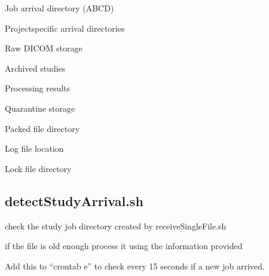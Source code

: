 \documentclass[letterpaper,10pt,english]{sphinxmanual}
\begin{document}
\begin{DUlineblock}{0em}
\item[] \sphinxhyphen{}  \sphinxhyphen{} Job arrival directory (ABCD)
\item[] \sphinxhyphen{}  \sphinxhyphen{} Project\sphinxhyphen{}specific arrival directories
\item[] \sphinxhyphen{}  \sphinxhyphen{} Raw DICOM storage
\item[] \sphinxhyphen{}  \sphinxhyphen{} Archived studies
\item[] \sphinxhyphen{}  \sphinxhyphen{} Processing results
\item[] \sphinxhyphen{}  \sphinxhyphen{} Quarantine storage
\item[] \sphinxhyphen{}  \sphinxhyphen{} Packed file directory
\item[] \sphinxhyphen{}  \sphinxhyphen{} Log file location
\item[] \sphinxhyphen{}  \sphinxhyphen{} Lock file directory
\end{DUlineblock}


\subsection{detectStudyArrival.sh}
\label{\detokenize{Architecture/scripts/detectStudyArrival:detectstudyarrival-sh}}\label{\detokenize{Architecture/scripts/detectStudyArrival::doc}}
\sphinxAtStartPar
check the study job directory created by receiveSingleFile.sh

\sphinxAtStartPar
if the file is old enough process it using the information provided

\sphinxAtStartPar
Add this to “crontab \sphinxhyphen{}e” to check every 15 seconds if a new job arrived.

\sphinxAtStartPar
{}

\sphinxAtStartPar
{}
\end{document}
